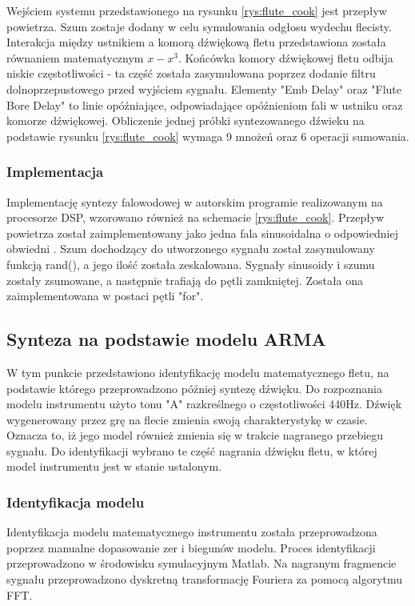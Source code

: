 Wejściem systemu przedstawionego na rysunku \ref{rys:flute_cook} jest przepływ powietrza. Szum zostaje dodany w celu symulowania odgłosu wydechu flecisty. 
Interakcja między ustnikiem a komorą dźwiękową fletu przedstawiona została równaniem matematycznym $x-x^3$. Końcówka komory dźwiękowej fletu odbija niskie częstotliwości - ta część została zasymulowana poprzez dodanie filtru dolnoprzepustowego przed wyjściem sygnału. Elementy "Emb Delay" oraz "Flute Bore Delay" to linie opóźniające, odpowiadające opóźnieniom fali w ustniku oraz komorze dźwiękowej. 
Obliczenie jednej próbki syntezowanego dźwieku na podstawie rysunku \ref{rys:flute_cook} wymaga 9 mnożeń oraz 6 operacji sumowania.

\subsubsection{Implementacja}
Implementację syntezy falowodowej w autorskim programie realizowanym na procesorze DSP,  wzorowano również na schemacie \ref{rys:flute_cook}. Przepływ powietrza został zaimplementowany jako jedna fala sinusoidalna o odpowiedniej obwiedni \cite{flute_prezka}. Szum dochodzący do utworzonego sygnału został zasymulowany funkcją rand(), a jego ilość została zeskalowana. Sygnały sinusoidy i szumu zostały zsumowane, a następnie trafiają do pętli zamkniętej. Została ona zaimplementowana w postaci pętli "for".

\subsection{Synteza na podstawie modelu ARMA}
W tym punkcie przedstawiono identyfikację modelu matematycznego fletu, na podstawie którego przeprowadzono później syntezę dźwięku. Do rozpoznania modelu instrumentu użyto tonu "A" razkreślnego o częstotliwości 440Hz. Dźwięk wygenerowany przez grę na flecie zmienia swoją charakterystykę w czasie. Oznacza to, iż jego model również zmienia się w trakcie nagranego przebiegu sygnału. Do identyfikacji wybrano te część nagrania dźwięku fletu, w której model instrumentu jest w stanie ustalonym.

\subsubsection{Identyfikacja modelu}
Identyfikacja modelu matematycznego instrumentu została przeprowadzona poprzez manualne dopasowanie zer i biegunów modelu.
Proces identyfikacji przeprowadzono w środowisku symulacyjnym Matlab. Na nagranym fragmencie sygnału przeprowadzono dyskretną transformację Fouriera za pomocą algorytmu FFT.

